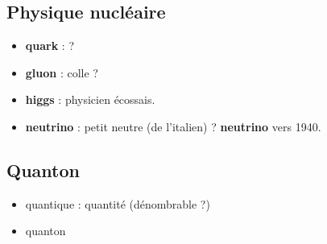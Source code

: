 \subsection{Physique nucléaire}

\begin{itemize}[leftmargin=1cm, label=, itemsep=1pt]
\item {\bf quark} : ?
\item {\bf gluon} : colle ?
\item {\bf higgs} : physicien écossais.
\item {\bf neutrino} : petit neutre (de l'italien) ? {\bf neutrino} vers 1940.
\end{itemize}



\subsection{Quanton}
%

\begin{itemize}[leftmargin=1cm, label=, itemsep=1pt]
\item quantique : quantité (dénombrable ?)
\item quanton
\end{itemize}




